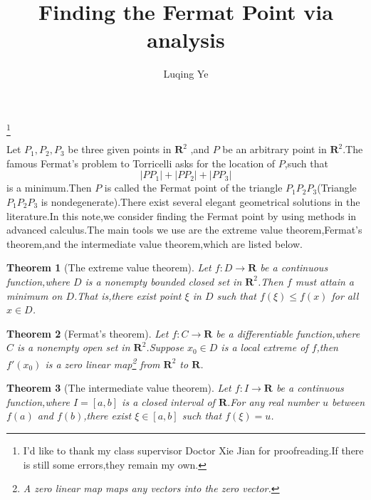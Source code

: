 \documentclass{amsart}
\theoremstyle{plain}
\newtheorem{theorem}{Theorem}
\theoremstyle{definition}
\begin{document}
\title{Finding the Fermat Point via analysis}
\author{Luqing Ye}
\address{College of Science, Hangzhou Normal University,Hangzhou City,Zhejiang Province,China}
 \thanks{I'd like to thank my class supervisor Doctor Xie Jian for
   proofreading.If there is still some errors,they remain my own.}

\maketitle

 Let $P_1,P_2,P_3$ be three given points in $\mathbf{R}^2$ ,and $P$ be an arbitrary
 point in $\mathbf{R}^2$.The famous Fermat's problem to
 Torricelli asks for the location of $P$,such that 
 \begin{equation*}
   |PP_1|+|PP_2|+|PP_3|
 \end{equation*}
is a minimum.Then $P$ is called the Fermat point of the triangle
$P_1P_2P_3$(Triangle $P_1P_2P_{3}$ is  nondegenerate).There exist several elegant geometrical solutions in the
literature.In this note,we consider finding the Fermat point by
using methods in advanced calculus.The main tools we use are the 
extreme value theorem,Fermat's theorem,and the intermediate value
theorem,which are listed below.
\begin{theorem}[The extreme value theorem]
Let $f:D\to \mathbf{R}$ be a continuous function,where $D$ is a
nonempty bounded closed set in $\mathbf{R}^2$.Then $f$ must attain a minimum
on $D$.That is,there exist point $\xi$ in $D$ such that $f(\xi)\leq
f(x)$ for all $x\in D$.
\end{theorem}
\begin{theorem}[Fermat's theorem]
  Let $f:C\to \mathbf{R}$ be a differentiable function,where $C$ is a
  nonempty open set in $\mathbf{R}^2$.Suppose $x_0\in D$ is a local
  extreme of $f$,then $f'(x_0)$ is a zero linear map\footnote{A zero
    linear map maps any vectors into the zero vector.} from
  $\mathbf{R}^2$ to $\mathbf{R}$.
\end{theorem}
\begin{theorem}[The intermediate value theorem]
  Let $f:I\to \mathbf{R}$ be a continuous function,where $I=[a,b]$ is a
  closed interval of $\mathbf{R}$.For any real number $u$ between
  $f(a)$ and $f(b)$,there exist $\xi\in [a,b]$ such that $f(\xi)=u$.
\end{theorem}
\end{document}

